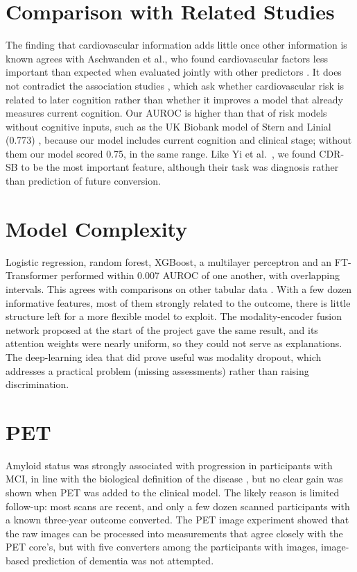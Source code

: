 \section{Comparison with Related Studies}

The finding that cardiovascular information adds little once other information is known agrees with Aschwanden et al., who found cardiovascular factors less important than expected when evaluated jointly with other predictors \cite{aschwanden2020}. It does not contradict the association studies \cite{jia2023,song2020}, which ask whether cardiovascular risk is related to later cognition rather than whether it improves a model that already measures current cognition. Our AUROC is higher than that of risk models without cognitive inputs, such as the UK Biobank model of Stern and Linial (0.773) \cite{stern2026}, because our model includes current cognition and clinical stage; without them our model scored 0.75, in the same range. Like Yi et al.\ \cite{yi2023}, we found CDR-SB to be the most important feature, although their task was diagnosis rather than prediction of future conversion.

\section{Model Complexity}

Logistic regression, random forest, XGBoost, a multilayer perceptron and an FT-Transformer performed within 0.007 AUROC of one another, with overlapping intervals. This agrees with comparisons on other tabular data \cite{gorishniy2021}. With a few dozen informative features, most of them strongly related to the outcome, there is little structure left for a more flexible model to exploit. The modality-encoder fusion network proposed at the start of the project gave the same result, and its attention weights were nearly uniform, so they could not serve as explanations. The deep-learning idea that did prove useful was modality dropout, which addresses a practical problem (missing assessments) rather than raising discrimination.

\section{PET}

Amyloid status was strongly associated with progression in participants with MCI, in line with the biological definition of the disease \cite{jack2024}, but no clear gain was shown when PET was added to the clinical model. The likely reason is limited follow-up: most scans are recent, and only a few dozen scanned participants with a known three-year outcome converted. The PET image experiment showed that the raw images can be processed into measurements that agree closely with the PET core's, but with five converters among the participants with images, image-based prediction of dementia was not attempted.

